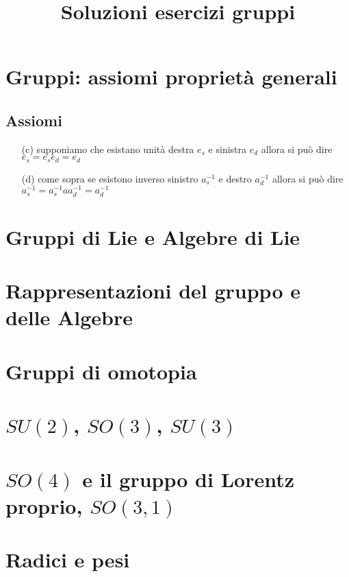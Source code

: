 \documentclass[a4paper]{article}
\begin{document}
	\title{Soluzioni esercizi gruppi}
	\maketitle
	
	\section{Gruppi: assiomi proprietà generali}
	\subsection{Assiomi}
	\begin{enumerate}[(a)]
	\item[(c)] supponiamo che esistano unità destra $e_s$ e sinistra $e_d$
	allora si può dire $e_s = e_se_d = e_d$
	\item[(d)]	come sopra se esistono inverso sinistro $a_s^{-1}$ e destro $a_d^{-1}$
	allora si può dire $a_s^{-1} = a_s^{-1} a a_d^{-1} = a_d^{-1}$
	\end{enumerate}
	
	\section{ Gruppi di Lie e Algebre di Lie}
	
	\section{Rappresentazioni del gruppo e delle Algebre}
	
	\section{Gruppi di omotopia}
	
	\section{$SU(2)$, $SO(3)$, $SU(3)$}
	
	\section{$SO(4)$ e il gruppo di Lorentz proprio, $SO(3,1)$}
	
	\section{Radici e pesi}	
	
\end{document}

